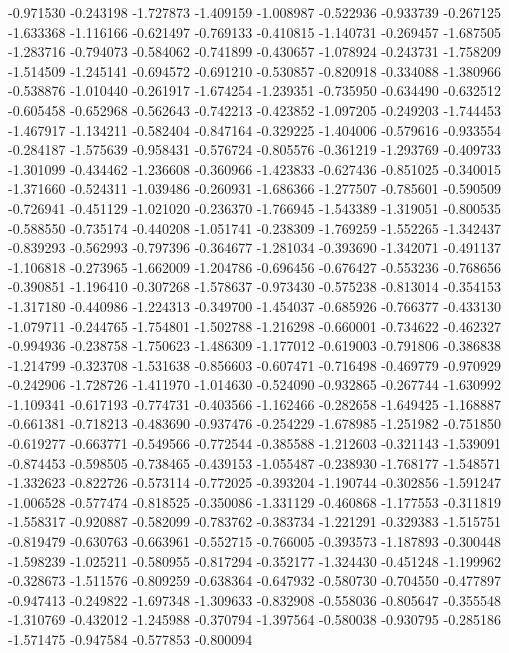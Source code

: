 -0.971530
-0.243198
-1.727873
-1.409159
-1.008987
-0.522936
-0.933739
-0.267125
-1.633368
-1.116166
-0.621497
-0.769133
-0.410815
-1.140731
-0.269457
-1.687505
-1.283716
-0.794073
-0.584062
-0.741899
-0.430657
-1.078924
-0.243731
-1.758209
-1.514509
-1.245141
-0.694572
-0.691210
-0.530857
-0.820918
-0.334088
-1.380966
-0.538876
-1.010440
-0.261917
-1.674254
-1.239351
-0.735950
-0.634490
-0.632512
-0.605458
-0.652968
-0.562643
-0.742213
-0.423852
-1.097205
-0.249203
-1.744453
-1.467917
-1.134211
-0.582404
-0.847164
-0.329225
-1.404006
-0.579616
-0.933554
-0.284187
-1.575639
-0.958431
-0.576724
-0.805576
-0.361219
-1.293769
-0.409733
-1.301099
-0.434462
-1.236608
-0.360966
-1.423833
-0.627436
-0.851025
-0.340015
-1.371660
-0.524311
-1.039486
-0.260931
-1.686366
-1.277507
-0.785601
-0.590509
-0.726941
-0.451129
-1.021020
-0.236370
-1.766945
-1.543389
-1.319051
-0.800535
-0.588550
-0.735174
-0.440208
-1.051741
-0.238309
-1.769259
-1.552265
-1.342437
-0.839293
-0.562993
-0.797396
-0.364677
-1.281034
-0.393690
-1.342071
-0.491137
-1.106818
-0.273965
-1.662009
-1.204786
-0.696456
-0.676427
-0.553236
-0.768656
-0.390851
-1.196410
-0.307268
-1.578637
-0.973430
-0.575238
-0.813014
-0.354153
-1.317180
-0.440986
-1.224313
-0.349700
-1.454037
-0.685926
-0.766377
-0.433130
-1.079711
-0.244765
-1.754801
-1.502788
-1.216298
-0.660001
-0.734622
-0.462327
-0.994936
-0.238758
-1.750623
-1.486309
-1.177012
-0.619003
-0.791806
-0.386838
-1.214799
-0.323708
-1.531638
-0.856603
-0.607471
-0.716498
-0.469779
-0.970929
-0.242906
-1.728726
-1.411970
-1.014630
-0.524090
-0.932865
-0.267744
-1.630992
-1.109341
-0.617193
-0.774731
-0.403566
-1.162466
-0.282658
-1.649425
-1.168887
-0.661381
-0.718213
-0.483690
-0.937476
-0.254229
-1.678985
-1.251982
-0.751850
-0.619277
-0.663771
-0.549566
-0.772544
-0.385588
-1.212603
-0.321143
-1.539091
-0.874453
-0.598505
-0.738465
-0.439153
-1.055487
-0.238930
-1.768177
-1.548571
-1.332623
-0.822726
-0.573114
-0.772025
-0.393204
-1.190744
-0.302856
-1.591247
-1.006528
-0.577474
-0.818525
-0.350086
-1.331129
-0.460868
-1.177553
-0.311819
-1.558317
-0.920887
-0.582099
-0.783762
-0.383734
-1.221291
-0.329383
-1.515751
-0.819479
-0.630763
-0.663961
-0.552715
-0.766005
-0.393573
-1.187893
-0.300448
-1.598239
-1.025211
-0.580955
-0.817294
-0.352177
-1.324430
-0.451248
-1.199962
-0.328673
-1.511576
-0.809259
-0.638364
-0.647932
-0.580730
-0.704550
-0.477897
-0.947413
-0.249822
-1.697348
-1.309633
-0.832908
-0.558036
-0.805647
-0.355548
-1.310769
-0.432012
-1.245988
-0.370794
-1.397564
-0.580038
-0.930795
-0.285186
-1.571475
-0.947584
-0.577853
-0.800094
